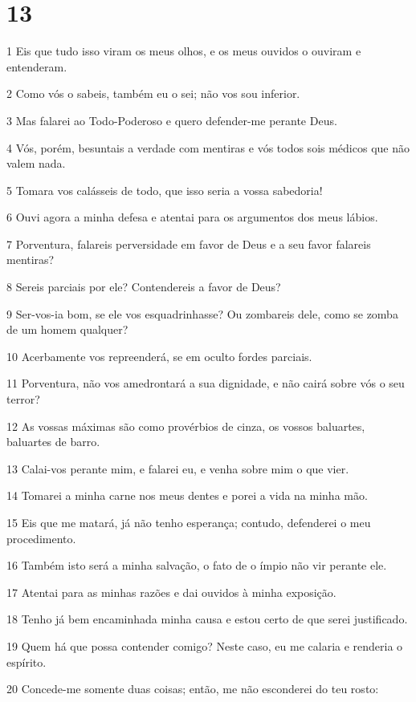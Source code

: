 \chapter{13}

\par 1 Eis que tudo isso viram os meus olhos, e os meus ouvidos o ouviram e entenderam.
\par 2 Como vós o sabeis, também eu o sei; não vos sou inferior.
\par 3 Mas falarei ao Todo-Poderoso e quero defender-me perante Deus.
\par 4 Vós, porém, besuntais a verdade com mentiras e vós todos sois médicos que não valem nada.
\par 5 Tomara vos calásseis de todo, que isso seria a vossa sabedoria!
\par 6 Ouvi agora a minha defesa e atentai para os argumentos dos meus lábios.
\par 7 Porventura, falareis perversidade em favor de Deus e a seu favor falareis mentiras?
\par 8 Sereis parciais por ele? Contendereis a favor de Deus?
\par 9 Ser-vos-ia bom, se ele vos esquadrinhasse? Ou zombareis dele, como se zomba de um homem qualquer?
\par 10 Acerbamente vos repreenderá, se em oculto fordes parciais.
\par 11 Porventura, não vos amedrontará a sua dignidade, e não cairá sobre vós o seu terror?
\par 12 As vossas máximas são como provérbios de cinza, os vossos baluartes, baluartes de barro.
\par 13 Calai-vos perante mim, e falarei eu, e venha sobre mim o que vier.
\par 14 Tomarei a minha carne nos meus dentes e porei a vida na minha mão.
\par 15 Eis que me matará, já não tenho esperança; contudo, defenderei o meu procedimento.
\par 16 Também isto será a minha salvação, o fato de o ímpio não vir perante ele.
\par 17 Atentai para as minhas razões e dai ouvidos à minha exposição.
\par 18 Tenho já bem encaminhada minha causa e estou certo de que serei justificado.
\par 19 Quem há que possa contender comigo? Neste caso, eu me calaria e renderia o espírito.
\par 20 Concede-me somente duas coisas; então, me não esconderei do teu rosto:
